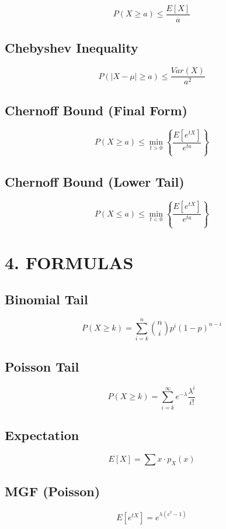 \documentclass[12pt]{article}
\begin{document}
\[
P(X \ge a) \le \frac{E[X]}{a}
\]

\subsection*{Chebyshev Inequality}

\[
P(|X - \mu| \ge a) \le \frac{Var(X)}{a^2}
\]

\subsection*{Chernoff Bound (Final Form)}

\[
P(X \ge a) \le \min_{t>0} \left\{ \frac{E[e^{tX}]}{e^{ta}} \right\}
\]

\subsection*{Chernoff Bound (Lower Tail)}

\[
P(X \le a) \le \min_{t<0} \left\{ \frac{E[e^{tX}]}{e^{ta}} \right\}
\]

\section*{4. FORMULAS}

\subsection*{Binomial Tail}

\[
P(X \ge k) = \sum_{i=k}^{n} \binom{n}{i} p^i (1-p)^{n-i}
\]

\subsection*{Poisson Tail}

\[
P(X \ge k) = \sum_{i=k}^{\infty} e^{-\lambda} \frac{\lambda^i}{i!}
\]

\subsection*{Expectation}

\[
E[X] = \sum x \cdot p_X(x)
\]

\subsection*{MGF (Poisson)}

\[
E[e^{tX}] = e^{\lambda(e^t - 1)}
\]
\end{document}
